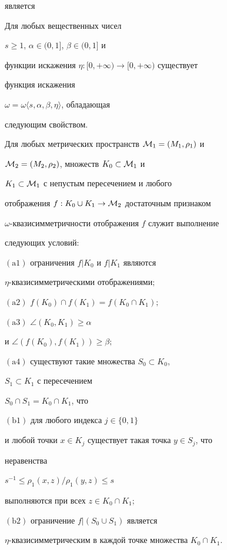 является 





\begin{thms} 


Для любых вещественных чисел 


$s\geq 1$, $\alpha \in (0,1]$, $\beta \in (0,1]$ и 


функции искажения $\eta: [0,+\infty) \to [0,+\infty)$ существует 


функция искажения 


$\omega=\omega\langle s, \alpha, \beta, \eta \rangle $, обладающая 


следующим свойством. 





Для любых метрических пространств ${\cal M}_1=(M_1, \rho_1)$ и 


${\cal M}_2=(M_2, \rho_2)$, множеств $K_0 \subset {\cal M}_1$ и 


$K_1 \subset {\cal M}_1$ с непустым пересечением и любого 


отображения $f: K_0\cup K_1 \to {\cal M}_2$ достаточным признаком 


$\omega$-{}квазисимметричности отображения $f$ служит выполнение 


следующих условий\/${:}$





$(\mathrm a1)$ ограничения $f|K_0$ и $f|K_1$ являются 


$\eta$-{}квазисимметрическими отображениями\/$;$





$(\mathrm a2)$ $f(K_0) \cap f(K_1)=f(K_0 \cap K_1);$





$(\mathrm a3)$ $\angle(K_0, K_1) \geq \alpha$


и $\angle(f(K_0), f(K_1)) \geq \beta;$ 





$(\mathrm a4)$ существуют такие множества $S_0 \subset K_0$,


$S_1 \subset K_1$ с пересечением 


$S_0\cap S_1=K_0\cap K_1$, что 





$(\mathrm b1)$ для любого индекса $j\in \{ 0,1 \}$ 


и любой точки $x\in K_j$ существует такая точка $y \in S_j$, что 


неравенства 


$s^{-1} \leq \rho_1(x,z)/ \rho_1(y,z) \leq s$ 


выполняются при всех $z\in K_0\cap K_1;$





$(\mathrm b2)$ ограничение $f|(S_0\cup S_1)$ является 


$\eta$-{}квазисимметрическим в каждой точке множества $K_0\cap K_1$. 


\end{thms}
